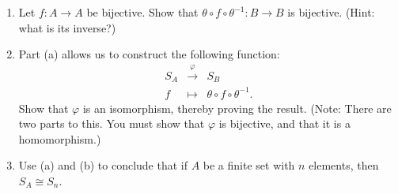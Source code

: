 \documentclass[11pt]{article}
\begin{document}
\begin{enumerate}
  \begin{enumerate}
    \item Let $f:A\to A$ be bijective.  Show that $\theta\circ f\circ \theta^{-1}:B\to B$ is bijective.  (Hint: what is its inverse?)
    \item Part (a) allows us to construct the following function:
    \begin{eqnarray*}
      S_A&\stackrel{\varphi}{\longrightarrow}&S_B\\
      f&\longmapsto&\theta\circ f\circ\theta^{-1}.
    \end{eqnarray*}
    Show that $\varphi$ is an isomorphism, thereby proving the result.  (Note: There are two parts to this.  You must show that $\varphi$ is bijective, and that it is a homomorphism.)
    \item{Use (a) and (b) to conclude that if $A$ be a finite set with $n$ elements, then $S_A\cong S_n$.}
  \end{enumerate}
\end{enumerate}
\end{document}
